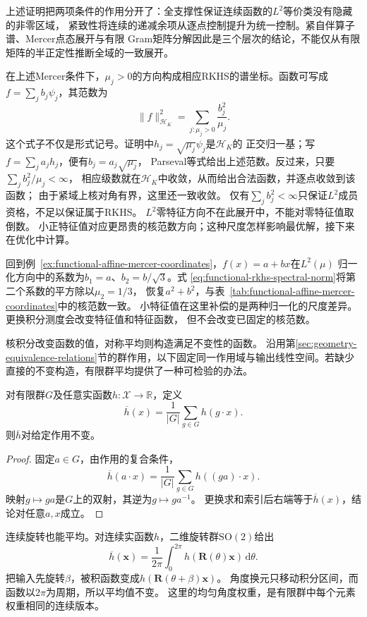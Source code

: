 上述证明把两项条件的作用分开了：全支撑性保证连续函数的$L^2$等价类没有隐藏的非零区域，
紧致性将连续的递减余项从逐点控制提升为统一控制。紧自伴算子谱、Mercer点态展开与有限
Gram矩阵分解因此是三个层次的结论，不能仅从有限矩阵的半正定性推断全域的一致展开。

在上述Mercer条件下，$\mu_j>0$的方向构成相应RKHS的谱坐标。函数可写成
$f=\sum_jb_j\psi_j$，其范数为
\begin{equation}
  \lVert f\rVert_{\mathcal{H}_K}^2
  =
  \sum_{j:\mu_j>0}\frac{b_j^2}{\mu_j}.
  \label{eq:functional-rkhs-spectral-norm}
\end{equation}
这个式子不仅是形式记号。证明中$h_j=\sqrt{\mu_j}\psi_j$是$\mathcal H_K$的
正交归一基；写$f=\sum_j a_jh_j$，便有$b_j=a_j\sqrt{\mu_j}$，
Parseval等式给出上述范数。反过来，只要$\sum_j b_j^2/\mu_j<\infty$，
相应级数就在$\mathcal H_K$中收敛，从而给出合法函数，并逐点收敛到该函数；
由于紧域上核对角有界，这里还一致收敛。
仅有$\sum_j b_j^2<\infty$只保证$L^2$成员资格，不足以保证属于RKHS。
$L^2$零特征方向不在此展开中，不能对零特征值取倒数。
小正特征值对应更昂贵的核范数方向；这种尺度怎样影响最优解，接下来在优化中计算。

回到例~\ref{ex:functional-affine-mercer-coordinates}，$f(x)=a+bx$在$L^2(\mu)$
归一化方向中的系数为$b_1=a$、$b_2=b/\sqrt3$。式
\eqref{eq:functional-rkhs-spectral-norm}将第二个系数的平方除以$\mu_2=1/3$，
恢复$a^2+b^2$，与表~\ref{tab:functional-affine-mercer-coordinates}中的核范数一致。
小特征值在这里补偿的是两种归一化的尺度差异。更换积分测度会改变特征值和特征函数，
但不会改变已固定的核范数。


核积分改变函数的值，对称平均则构造满足不变性的函数。
沿用第\ref{sec:geometry-equivalence-relations}节的群作用，以下固定同一作用域与输出线性空间。若缺少直接的不变构造，有限群平均提供了一种可检验的办法。
\begin{theorem}[有限群平均的不变性]
\label{thm:geometry-finite-group-average}
对有限群$G$及任意实函数$h:\mathcal X\to\mathbb R$，定义
\begin{equation}
 \overline h(x)=\frac1{|G|}\sum_{g\in G}h(g\cdot x).
 \label{eq:geometry-finite-group-averaging}
\end{equation}
则$\overline h$对给定作用不变。
\end{theorem}
\begin{proof}
固定$a\in G$，由作用的复合条件，
\[
 \overline h(a\cdot x)=\frac1{|G|}\sum_{g\in G}h((ga)\cdot x).
\]
映射$g\mapsto ga$是$G$上的双射，其逆为$g\mapsto ga^{-1}$。
更换求和索引后右端等于$\overline h(x)$，结论对任意$a,x$成立。
\end{proof}
连续旋转也能平均。对连续实函数$h$，二维旋转群$\mathrm{SO}(2)$给出
\[
 \overline h(\bm x)=\frac1{2\pi}\int_0^{2\pi}
 h(\bm R(\theta)\bm x)\,\mathrm d\theta.
\]
把输入先旋转$\beta$，被积函数变成$h(\bm R(\theta+\beta)\bm x)$。
角度换元只移动积分区间，而函数以$2\pi$为周期，所以平均值不变。
这里的均匀角度权重，是有限群中每个元素权重相同的连续版本。

